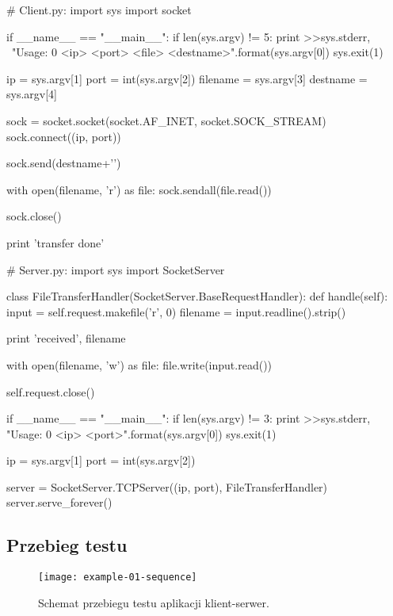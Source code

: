 \documentclass[00-praca-magisterska.tex]{subfiles}
\begin{document}
\begin{pythoncode}
  # Client.py:
  import sys
  import socket

  if __name__ == "__main__":
      if len(sys.argv) != 5:
	  print >>sys.stderr, \
	      "Usage: {0} <ip> <port> <file> <destname>".format(sys.argv[0])
	  sys.exit(1)

      ip = sys.argv[1]
      port = int(sys.argv[2])
      filename = sys.argv[3]
      destname = sys.argv[4]

      sock = socket.socket(socket.AF_INET, socket.SOCK_STREAM)
      sock.connect((ip, port))

      sock.send(destname+'\n')

      with open(filename, 'r') as file:
          sock.sendall(file.read())

      sock.close()

      print 'transfer done'

\end{pythoncode}

\begin{pythoncode}
  # Server.py:
  import sys
  import SocketServer

  class FileTransferHandler(SocketServer.BaseRequestHandler):
      def handle(self):
          input  = self.request.makefile('r', 0)
          filename = input.readline().strip()

          print 'received', filename

          with open(filename, 'w') as file:
	      file.write(input.read())
  
          self.request.close()

  if __name__ == "__main__":
      if len(sys.argv) != 3:
          print >>sys.stderr, "Usage: {0} <ip> <port>".format(sys.argv[0])
          sys.exit(1)

      ip = sys.argv[1]
      port = int(sys.argv[2])

      server = SocketServer.TCPServer((ip, port), FileTransferHandler)
      server.serve_forever()

\end{pythoncode}

\subsection{Przebieg testu}

\begin{figure}[htb]
\begin{center}
\leavevmode
\texttt{[image: example-01-sequence]}
\end{center}
\caption{Schemat przebiegu testu aplikacji klient-serwer.}
\label{fig:example-01-sequence}
\end{figure}
\end{document}
